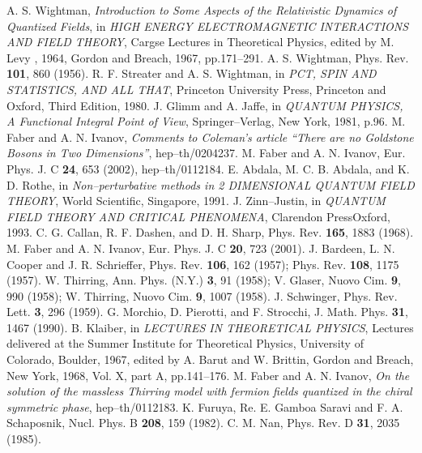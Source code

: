 \documentclass[a4paper,12pt] {article}
\begin{document}
\begin{thebibliography}{9}
\bibitem{[1]} 
A. S. Wightman, 
{\it Introduction to Some Aspects of the
Relativistic Dynamics of Quantized Fields}, in {\it HIGH ENERGY
ELECTROMAGNETIC INTERACTIONS AND FIELD THEORY}, Carg\coordHE{}se
Lectures in Theoretical Physics, edited by M. Levy , 1964, Gordon and
Breach, 1967, pp.171--291.
\bibitem{[2]}
A. S. Wightman,
Phys. Rev. {\bf 101}, 860 (1956).
\bibitem{[3]} 
R. F. Streater and A. S. Wightman,
in {\it PCT, SPIN AND STATISTICS, AND ALL THAT},
Princeton University Press, Princeton and Oxford, Third Edition, 
1980.
\bibitem{[4]} 
J. Glimm and A. Jaffe, 
in {\it QUANTUM PHYSICS, A
Functional Integral Point of View}, 
Springer--Verlag, New York, 1981, p.96.
\bibitem{[5]}
M. Faber and A. N. Ivanov,
{\it Comments to Coleman's article ``There are no Goldstone Bosons 
in Two Dimensions''}, hep--th/0204237.
\bibitem{[6]}
M. Faber and A. N. Ivanov,
Eur. Phys. J. C {\bf 24}, 653 (2002), hep--th/0112184.
\bibitem{[7]}
E. Abdala, M. C. B. Abdala, and K. D. Rothe,
in {\it Non--perturbative methods in 2 DIMENSIONAL 
QUANTUM FIELD THEORY}, World Scientific, Singapore, 1991.
\bibitem{[8]}
J. Zinn--Justin,
in {\it QUANTUM FIELD THEORY AND CRITICAL PHENOMENA},
Clarendon Press\myHighlight{$\,\bullet\,$}\coordHE{}Oxford, 1993.
\bibitem{[9]}
C. G. Callan, R. F. Dashen, and D. H. Sharp,
Phys. Rev. {\bf 165}, 1883 (1968).
\bibitem{[10]}
M. Faber and A. N. Ivanov,
Eur. Phys. J. C {\bf 20}, 723 (2001).
\bibitem{[11]} 
J. Bardeen, L. N. Cooper and J. R. Schrieffer,
Phys. Rev. {\bf 106}, 162 (1957); Phys. Rev. {\bf 108}, 1175 (1957).
\bibitem{[12]}
W. Thirring, 
Ann. Phys. (N.Y.) {\bf 3}, 91 (1958);
V. Glaser,
Nuovo Cim. {\bf 9}, 990 (1958);
W. Thirring,
Nuovo Cim. {\bf 9}, 1007 (1958).
\bibitem{[13]}
J. Schwinger,
Phys. Rev. Lett. {\bf 3}, 296 (1959).
\bibitem{[14]}
G. Morchio, D. Pierotti, and F. Strocchi,
J. Math. Phys. {\bf 31}, 1467 (1990).
\bibitem{[15]}
B. Klaiber, 
in {\it LECTURES IN THEORETICAL PHYSICS},
Lectures delivered at the Summer Institute for Theoretical Physics,
University of Colorado, Boulder, 1967, edited by A. Barut and
W. Brittin, Gordon and Breach, New York, 1968, Vol. X, 
part A, pp.141--176.
\bibitem{[16]}
M. Faber and A. N. Ivanov,
{\it On the solution of the massless
Thirring model  with fermion
fields quantized in the chiral symmetric phase},  hep--th/0112183.
\bibitem{[17]}
K. Furuya, Re. E. Gamboa Saravi and F. A. Schaposnik,
Nucl. Phys. B {\bf 208}, 159 (1982).
\bibitem{[18]}
C. M. Na\coordHE{}n,
Phys. Rev. D {\bf 31}, 2035 (1985).

\end{thebibliography}
\end{document}
